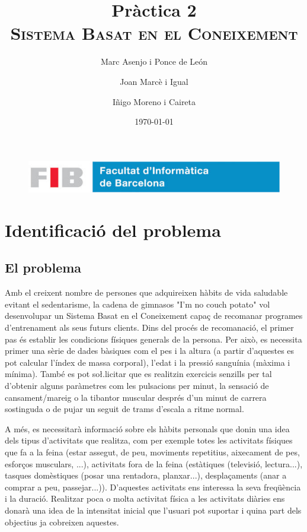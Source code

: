 \documentclass[a4paper, 12pt, UTF8]{article}
\title{
	\Huge
	\textbf{Pràctica 2} \\ 
	\scshape Sistema Basat en el Coneixement
		}
\author{
	Marc Asenjo i Ponce de León \and
	Joan Marcè i Igual \and
	Iñigo Moreno i Caireta
}
\date{\today}
\begin{document}
\maketitle

\begin{figure}
	\centering
	\includegraphics[width=\linewidth]{./simple_FIB}
\end{figure}

\newpage
\tableofcontents

\newpage


\section{Identificació del problema}

\subsection{El problema}

Amb el creixent nombre de persones que adquireixen hàbits de vida saludable evitant el sedentarisme, la cadena de gimnasos "I'm no couch potato" vol desenvolupar un Sistema Basat en el Coneixement capaç de recomanar programes d'entrenament als seus futurs clients. Dins del procés de recomanació, el primer pas és establir les condicions físiques generals de la persona. Per això, es necessita primer una sèrie de dades bàsiques com el pes i la altura (a partir d'aquestes es pot calcular l'índex de massa corporal), l'edat i la pressió sanguínia (màxima i mínima). També es pot so\l.licitar que es realitzin exercicis senzills per tal d'obtenir alguns paràmetres com les pulsacions per minut, la sensació de cansament/mareig o la tibantor muscular després d'un minut de carrera sostinguda o de pujar un seguit de trams d'escala a ritme normal. 

A més, es necessitarà informació sobre els hàbits personals que donin una idea dels tipus d'activitats que realitza, com per exemple totes les activitats físiques que fa a la feina (estar assegut, de peu, moviments repetitius, aixecament de pes, esforços musculars, ...), activitats fora de la feina (estàtiques (televisió, lectura...), tasques domèstiques (posar una rentadora, planxar...), desplaçaments (anar a comprar a peu, passejar...)). D'aquestes activitats ens interessa la seva freqüència i la duració. Realitzar poca o molta activitat física a les activitats diàries ens donarà una idea de la intensitat inicial que l'usuari pot suportar i quina part dels objectius ja cobreixen aquestes. 
\end{document}
